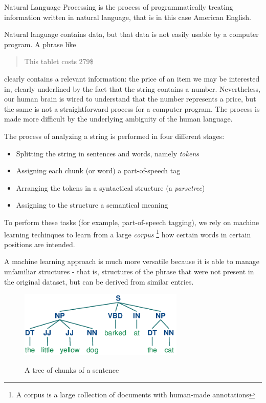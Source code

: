 \documentclass[LaM,oneside,binding=0.6cm]{sapthesis}
\begin{document}
Natural Language Processing is the process of programmatically treating information written in natural language, that is in this case American English. 

Natural language contains data, but that data is not easily usable by a computer program. A phrase like

\begin{quote}
This tablet costs 279\$
\end{quote}

clearly contains a relevant information: the price of an item we may be interested in, clearly underlined by the fact that the string contains a number. Nevertheless, our human brain is wired to understand that the number represents a price, but the same is not a straightforward process for a computer program. The process is made more difficult by the underlying ambiguity of the human language. 

The process of analyzing a string is performed in four different stages:
\begin{itemize}
	\item Splitting the string in sentences and words, namely \textit{tokens}
	\item Assigning each chunk (or word) a part-of-speech tag
	\item Arranging the tokens in a syntactical structure (a \textit{parsetree})
	\item Assigning to the structure a semantical meaning
\end{itemize}

To perform these tasks (for example, part-of-speech tagging), we rely on machine learning techinques to learn from a large \textit{corpus} \footnote{A corpus is a large collection of documents with human-made annotations} how certain words in certain positions are intended.

A machine learning approach is much more versatile because it is able to manage unfamiliar structures - that is, structures of the phrase that were not present in the original dataset, but can be derived from similar entries.

\begin{figure}
\centering
\includegraphics[width=0.7\textwidth]{pictures/chunktree.png}\\[3ex]
\caption{A tree of chunks of a sentence}
\label{fig:chunktree}
\end{figure}
\end{document}

